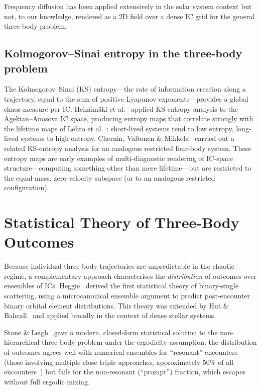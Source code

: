 \documentclass[11pt,a4paper]{article}
\begin{document}
Frequency diffusion has been applied extensively in the solar system context but not, to our
knowledge, rendered as a 2D field over a dense IC grid for the general three-body problem.

\subsection{Kolmogorov--Sinai entropy in the three-body problem}
\label{sec:ksentropy}

The Kolmogorov--Sinai (KS) entropy---the rate of information creation along a trajectory,
equal to the sum of positive Lyapunov exponents---provides a global chaos measure per IC.
Heinäm\"{a}ki et al.~\cite{chernin2000} applied KS-entropy analysis to the
Agekian--Anosova IC space, producing entropy maps that correlate strongly with the lifetime
maps of Lehto et al.~\cite{lehto2008}: short-lived systems tend to low entropy, long-lived
systems to high entropy.  Chernin, Valtonen \& Mikkola~\cite{chernin1994} carried out a
related KS-entropy analysis for an analogous restricted four-body system.  These entropy maps
are early examples of multi-diagnostic rendering of IC-space structure---computing something
other than mere lifetime---but are restricted to the equal-mass, zero-velocity subspace (or
to an analogous restricted configuration).

\section{Statistical Theory of Three-Body Outcomes}

Because individual three-body trajectories are unpredictable in the chaotic regime, a
complementary approach characterises the \emph{distribution} of outcomes over ensembles of ICs.
Heggie~\cite{heggie1975} derived the first statistical theory of binary-single scattering, using
a microcanonical ensemble argument to predict post-encounter binary orbital element distributions.
This theory was extended by Hut \& Bahcall~\cite{hutbahcall1983} and applied broadly in the
context of dense stellar systems.

Stone \& Leigh~\cite{stone2019} gave a modern, closed-form statistical solution to the
non-hierarchical three-body problem under the ergodicity assumption: the distribution of
outcomes agrees well with numerical ensembles for ``resonant'' encounters (those involving
multiple close triple approaches, approximately 50\% of all encounters~\cite{stone2019}) but fails for the
non-resonant (``prompt'') fraction, which escapes without full ergodic mixing.
\end{document}
